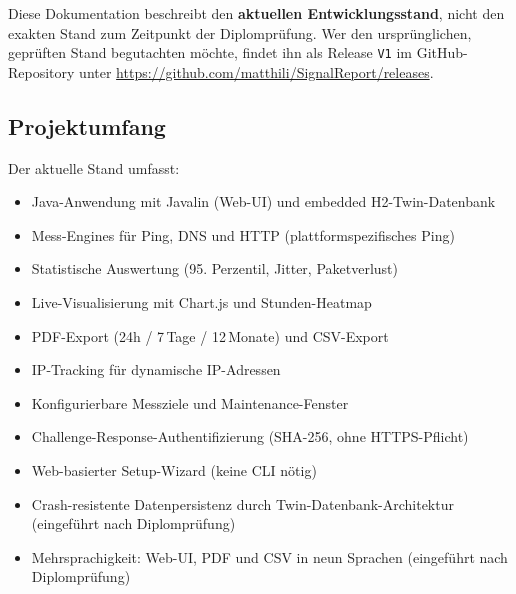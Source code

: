 Diese Dokumentation beschreibt den \textbf{aktuellen Entwicklungsstand}, nicht den exakten Stand zum Zeitpunkt der Diplomprüfung. Wer den ursprünglichen, geprüften Stand begutachten möchte, findet ihn als Release \texttt{V1} im GitHub-Repository unter \newline\href{https://github.com/matthili/SignalReport/releases}{https://github.com/matthili/SignalReport/releases}.

\subsection{Projektumfang}
Der aktuelle Stand umfasst:
\begin{itemize}
    \item Java-Anwendung mit Javalin (Web-UI) und embedded H2-Twin-Datenbank
    \item Mess-Engines für Ping, DNS und HTTP (plattformspezifisches Ping)
    \item Statistische Auswertung (95. Perzentil, Jitter, Paketverlust)
    \item Live-Visualisierung mit Chart.js und Stunden-Heatmap
    \item PDF-Export (24h / 7\,Tage / 12\,Monate) und CSV-Export
    \item IP-Tracking für dynamische IP-Adressen
    \item Konfigurierbare Messziele und Maintenance-Fenster
    \item Challenge-Response-Authentifizierung (SHA-256, ohne HTTPS-Pflicht)
    \item Web-basierter Setup-Wizard (keine CLI nötig)
    \item Crash-resistente Datenpersistenz durch Twin-Datenbank-Architektur (eingeführt nach Diplomprüfung)
    \item Mehrsprachigkeit: Web-UI, PDF und CSV in neun Sprachen (eingeführt nach Diplomprüfung)
\end{itemize}